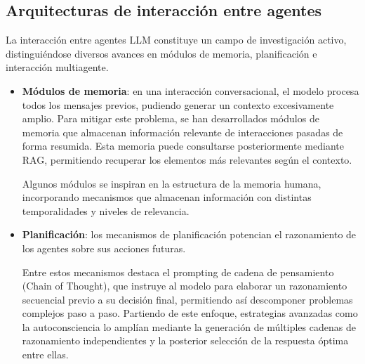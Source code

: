 



\subsection{Arquitecturas de interacción entre agentes}
La interacción entre agentes LLM constituye un campo de investigación activo, distinguiéndose diversos avances en módulos de memoria, planificación e interacción multiagente\cite{wang_survey_2024}.
\begin{itemize}
  \label{sec:modulos_memoria}
  \item{\textbf{Módulos de memoria}}: en una interacción conversacional, el modelo procesa todos los mensajes previos, pudiendo generar un contexto excesivamente amplio. Para mitigar este problema, se han desarrollados módulos de memoria que almacenan información relevante de interacciones pasadas de forma resumida\cite{zhang_building_2024-1}\cite{fischer_reflective_2023}\cite{liang_unleashing_2023}. Esta memoria puede consultarse posteriormente mediante RAG, permitiendo recuperar los elementos más relevantes según el contexto\cite{zhao_expel_2024}.

Algunos módulos se inspiran en la estructura de la memoria humana\cite{zhong_memorybank_2024}, incorporando mecanismos que almacenan información con distintas temporalidades y niveles de relevancia\cite{wang_survey_2024}\cite{park_generative_2023}.


\item{\textbf{Planificación}}\label{plani}: los mecanismos de planificación potencian el razonamiento de los agentes sobre sus acciones futuras.

  Entre estos mecanismos destaca el prompting de cadena de pensamiento (Chain of Thought)\cite{wei_chain--thought_2023}, que instruye al modelo para elaborar un razonamiento secuencial previo a su decisión final, permitiendo así descomponer problemas complejos paso a paso.
Partiendo de este enfoque, estrategias avanzadas como la autoconsciencia\cite{liang_unleashing_2023} lo amplían mediante la generación de múltiples cadenas de razonamiento independientes y la posterior selección de la respuesta óptima entre ellas\cite{yao_tree_nodate}\cite{wang_recmind_2024}.


\end{itemize}
